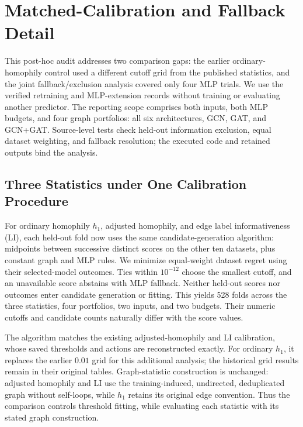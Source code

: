 \section{Matched-Calibration and Fallback Detail}
\label{app:matched_detail}

This post-hoc audit addresses two comparison gaps: the earlier ordinary-homophily control used a different cutoff grid from the published statistics, and the joint fallback/exclusion analysis covered only four MLP trials. We use the verified retraining and MLP-extension records without training or evaluating another predictor. The reporting scope comprises both inputs, both MLP budgets, and four graph portfolios: all six architectures, GCN, GAT, and GCN+GAT. Source-level tests check held-out information exclusion, equal dataset weighting, and fallback resolution; the executed code and retained outputs bind the analysis.

\subsection{Three Statistics under One Calibration Procedure}

For ordinary homophily $h_1$, adjusted homophily, and edge label informativeness (LI), each held-out fold now uses the same candidate-generation algorithm: midpoints between successive distinct scores on the other ten datasets, plus constant graph and MLP rules. We minimize equal-weight dataset regret using their selected-model outcomes. Ties within $10^{-12}$ choose the smallest cutoff, and an unavailable score abstains with MLP fallback. Neither held-out scores nor outcomes enter candidate generation or fitting. This yields 528 folds across the three statistics, four portfolios, two inputs, and two budgets. Their numeric cutoffs and candidate counts naturally differ with the score values.

The algorithm matches the existing adjusted-homophily and LI calibration, whose saved thresholds and actions are reconstructed exactly. For ordinary $h_1$, it replaces the earlier $0.01$ grid for this additional analysis; the historical grid results remain in their original tables. Graph-statistic construction is unchanged: adjusted homophily and LI use the training-induced, undirected, deduplicated graph without self-loops, while $h_1$ retains its original edge convention. Thus the comparison controls threshold fitting, while evaluating each statistic with its stated graph construction.


